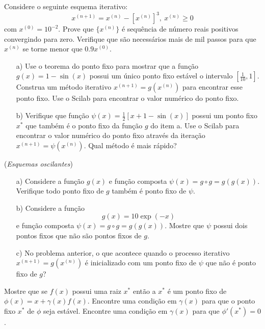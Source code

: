 \begin{Exercise}[title=Convergência sublinear] Considere o seguinte esquema iterativo:
$$x^{(n+1)}=x^{(n)}-[x^{(n)}]^3,\ x^{(n)}\geq 0$$
com $x^{(0)}= 10^{-2}$.
Prove que $\{x^{(n)}\}$ é sequência de número reais positivos convergindo para zero. Verifique que são necessários mais de mil passos para que $x^{(n)}$ se torne menor que $0.9 x^{(0)}$.
\end{Exercise}


\begin{Exercise}[title=Taxa de convergência]
\begin{itemize}
\item[a)] Use o teorema do ponto fixo para mostrar que a função $g(x)=1-\sin(x)$ possui um único ponto fixo estável o intervalo $[\frac{1}{10},1]$. Construa um método iterativo $x^{(n+1)}=g(x^{(n)})$ para encontrar esse ponto fixo. Use o Scilab para encontrar o valor numérico do ponto fixo.
\item[b)] Verifique que função $\psi(x)=\frac{1}{2}\left[x+1-\sin(x)\right]$ possui um ponto fixo $x^*$ que também é o ponto fixo da função $g$ do item a. Use o Scilab para encontrar o valor numérico do ponto fixo através da iteração $x^{(n+1)}=\psi(x^{(n)})$. Qual método é mais rápido?
\end{itemize}
\end{Exercise}


\begin{Exercise}[title=Esquemas oscilantes](\textit{Esquemas oscilantes})
\begin{itemize}
\item[a)] Considere a função $g(x)$ e função composta $\psi(x)=g\circ g=g\left(g(x)\right)$. Verifique todo ponto fixo de $g$ também é ponto fixo de $\psi$.

\item[b)]  Considere a função $$g(x)=10\exp(-x)$$ e função composta $\psi(x)=g\circ g=g\left(g(x)\right)$. Mostre que $\psi$ possui dois pontos fixos que não são pontos fixos de $g$.

\item[c)]  No problema anterior, o que acontece quando o processo iterativo $x^{(n+1)}=g(x^{(n)})$ é inicializado com um ponto fixo de $\psi$ que não é ponto fixo de $g$?
\end{itemize}
\end{Exercise}

\begin{Exercise}[title= Aceleração de convergência - introdução ao método de Newton]\label{int_new1} Mostre que se $f(x)$ possui uma raiz $x^*$ então a $x^*$ é um ponto fixo de $\phi(x)=x+\gamma(x) f(x)$. Encontre uma condição em $\gamma(x)$ para que o ponto fixo $x^*$ de $\phi$ seja estável. Encontre uma condição em $\gamma(x)$ para que $\phi'(x^*)=0$.
\end{Exercise}

